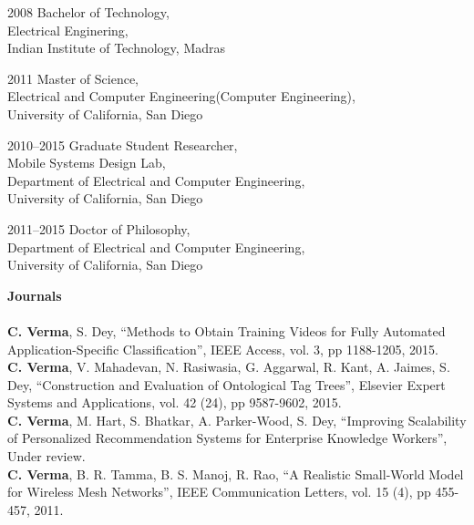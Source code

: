 \documentclass[12pt]{ucsddissertation}
\begin{document}
\begin{vita}
\noindent
\begin{cv}{}
\begin{cvlist}{}
\item[2008] Bachelor of Technology, \\Electrical Enginering, \\Indian Institute of Technology, Madras 
\item[2011] Master of Science, \\Electrical and Computer Engineering(Computer Engineering), \\University of California, San Diego 
\item[2010--2015] Graduate Student Researcher, \\Mobile Systems Design Lab, \\Department of Electrical and Computer Engineering, \\University of California, San Diego
\item[2011--2015]  Doctor of Philosophy, \\Department of Electrical and Computer Engineering, \\University of California, San Diego
\end{cvlist}
\end{cv}

\publications
{\justify
\noindent\textbf{Journals} \\ \\
\noindent \textbf{C. Verma}, S. Dey, ``Methods to Obtain Training Videos for Fully Automated Application-Specific Classification'', IEEE Access, vol. 3, pp 1188-1205, 2015. \\

\noindent \textbf{C. Verma}, V. Mahadevan, N. Rasiwasia, G. Aggarwal, R. Kant, A. Jaimes, S. Dey, ``Construction and Evaluation of Ontological Tag Trees'', Elsevier Expert Systems and Applications, vol. 42 (24), pp 9587-9602, 2015. \\

\noindent \textbf{C. Verma}, M. Hart, S. Bhatkar, A. Parker-Wood, S. Dey, ``Improving Scalability of Personalized Recommendation Systems for Enterprise Knowledge Workers'', Under review. \\

\noindent \textbf{C. Verma}, B. R. Tamma, B. S. Manoj, R. Rao, ``A Realistic Small-World Model for Wireless Mesh Networks'', IEEE Communication Letters, vol. 15 (4), pp 455-457, 2011. \\

}
\end{vita}
\end{document}
